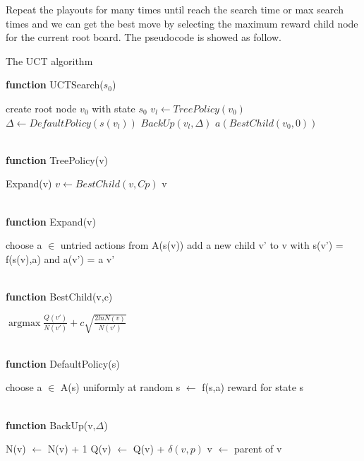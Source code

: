 \documentclass[12pt,a4paper]{article}
\begin{document}
\par Repeat the playouts for many times until reach the search time or max search times and we can get the best move by selecting the maximum reward child node for the current root board. The pseudocode is showed as follow.
\begin{algorithm}[H]
\caption{The UCT algorithm}
\hspace*{0.02in} {\bf function}
UCTSearch($s_0$)
\begin{algorithmic}
\State create root node $v_0$ with state $s_0$
	\State $v_l \gets TreePolicy(v_0)$
	\State $\Delta \gets DefaultPolicy(s(v_l))$
	\State $BackUp(v_l, \Delta)$
\EndWhile
\State \Return $a(BestChild(v_0, 0))$
\end{algorithmic}
~\\
\hspace*{0.02in} {\bf function}
TreePolicy(v)
\begin{algorithmic}
		\State \Return Expand(v)
	\Else
		\State $v \gets BestChild(v, Cp)$
	\EndIf
\EndWhile
\State \Return v
\end{algorithmic}
~\\
\hspace*{0.02in} {\bf function}
Expand(v)
\begin{algorithmic}
\State choose a $\in$ untried actions from A(s(v))
\State add a new child v' to v with s(v') = f(s(v),a) and a(v') = a
\State \Return v'
\end{algorithmic}
~\\
\hspace*{0.02in} {\bf function}
BestChild(v,c)
\begin{algorithmic}
\State \Return $\mathop{\arg\max} \frac{Q(v')}{N(v')} + c\sqrt{\frac{2lnN(v)}{N(v')}}$
\end{algorithmic}
~\\
\hspace*{0.02in} {\bf function}
DefaultPolicy(s)
\begin{algorithmic}
	\State choose a $\in$ A(s) uniformly at random
	\State s $\gets$ f(s,a)
\EndWhile
\State \Return reward for state s
\end{algorithmic}
~\\
\hspace*{0.02in} {\bf function}
BackUp(v,$\Delta$)
\begin{algorithmic}
	\State N(v) $\gets$ N(v) + 1
	\State Q(v) $\gets$ Q(v) + $\delta(v, p)$
	\State v $\gets$ parent of v
\EndWhile
\end{algorithmic}
\end{algorithm}
\end{document}

